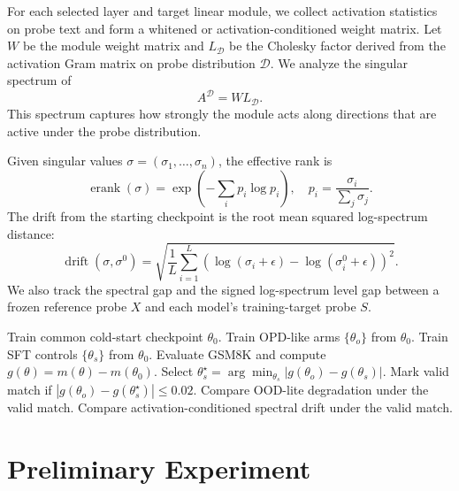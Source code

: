 \documentclass[letterpaper]{article}
\begin{document}
For each selected layer and target linear module, we collect activation statistics on probe text and form a whitened or activation-conditioned weight matrix.
Let $W$ be the module weight matrix and $L_{\mathcal{D}}$ be the Cholesky factor derived from the activation Gram matrix on probe distribution $\mathcal{D}$.
We analyze the singular spectrum of
\begin{equation}
A^{\mathcal{D}} = W L_{\mathcal{D}}.
\end{equation}
This spectrum captures how strongly the module acts along directions that are active under the probe distribution.

Given singular values $\sigma=(\sigma_1,\ldots,\sigma_n)$, the effective rank is
\begin{equation}
\operatorname{erank}(\sigma)=\exp\left(-\sum_i p_i \log p_i\right), \quad
p_i=\frac{\sigma_i}{\sum_j \sigma_j}.
\end{equation}
The drift from the starting checkpoint is the root mean squared log-spectrum distance:
\begin{equation}
\operatorname{drift}(\sigma,\sigma^0)
=\sqrt{\frac{1}{L}\sum_{i=1}^L
\left(\log(\sigma_i+\epsilon)-\log(\sigma_i^0+\epsilon)\right)^2}.
\end{equation}
We also track the spectral gap and the signed log-spectrum level gap between a frozen reference probe $X$ and each model's training-target probe $S$.

\begin{algorithm}[t]
\caption{Matched-Gain Stability Diagnostic}
\begin{algorithmic}[1]
\STATE Train common cold-start checkpoint $\theta_0$.
\STATE Train OPD-like arms $\{\theta_o\}$ from $\theta_0$.
\STATE Train SFT controls $\{\theta_s\}$ from $\theta_0$.
\STATE Evaluate GSM8K and compute $g(\theta)=m(\theta)-m(\theta_0)$.
    \STATE Select $\theta_s^\star = \arg\min_{\theta_s}|g(\theta_o)-g(\theta_s)|$.
    \STATE Mark valid match if $|g(\theta_o)-g(\theta_s^\star)|\leq 0.02$.
    \STATE Compare OOD-lite degradation under the valid match.
    \STATE Compare activation-conditioned spectral drift under the valid match.
\ENDFOR
\end{algorithmic}
\end{algorithm}

\section{Preliminary Experiment}
\end{document}
